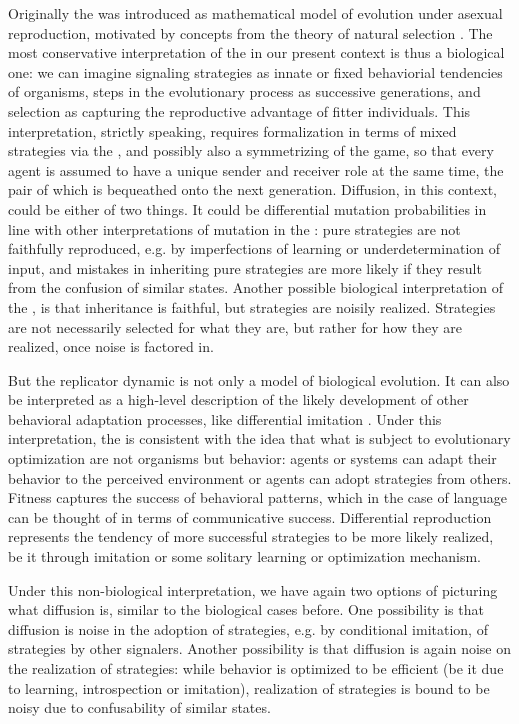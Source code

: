 Originally the \rd was introduced as mathematical model of evolution
under asexual reproduction, motivated by concepts from the theory of
natural selection \citep{TaylorJonker1978:Evolutionary-St}. The most
conservative interpretation of the \rdd in our present context is thus
a biological one: we can imagine signaling strategies as innate or
fixed behaviorial tendencies of organisms, steps in the evolutionary
process as successive generations, and selection as capturing the
reproductive advantage of fitter individuals. This interpretation,
strictly speaking, requires formalization in terms of mixed strategies
via the \rmd, and possibly also a symmetrizing of the game, so that
every agent is assumed to have a unique sender and receiver role at
the same time, the pair of which is bequeathed onto the next
generation. Diffusion, in this context, could be either of two
things. It could be differential mutation probabilities in line with
other interpretations of mutation in the \rmd
\citep[e.g.][]{NowakKomarova2001:Evolution-of-Un,KomarovaNiyogi2001:The-Evolutionar}:
pure strategies are not faithfully reproduced, e.g. by imperfections
of learning or underdetermination of input, and mistakes in
inheriting pure strategies are more likely if they result from the
confusion of similar states. Another possible biological
interpretation of the \rdd, is that inheritance is faithful, but
strategies are noisily realized. Strategies are not necessarily
selected for what they are, but rather for how they are realized, once
noise is factored in.

But the replicator dynamic is not only a model of biological
evolution. It can also be interpreted as a high-level description of
the likely development of other behavioral adaptation processes, like
differential imitation \citep[see][for various derivations of the
\rd]{Sandholm2013:Population-Game}. Under this interpretation, the \rd
is consistent with the idea that what is subject to evolutionary
optimization are not organisms but behavior: agents or systems can
adapt their behavior to the perceived environment or agents can adopt
strategies from others. Fitness captures the success of behavioral
patterns, which in the case of language can be thought of in terms of
communicative success.  Differential reproduction represents the
tendency of more successful strategies to be more likely realized, be
it through imitation or some solitary learning or optimization
mechanism.

Under this non-biological interpretation, we have again two options of
picturing what diffusion is, similar to the biological cases
before. One possibility is that diffusion is noise in the adoption of
strategies, e.g. by conditional imitation, of strategies by other
signalers. Another possibility is that diffusion is again noise on the
realization of strategies: while behavior is optimized to be efficient
(be it due to learning, introspection or imitation), realization of
strategies is bound to be noisy due to confusability of similar
states.

